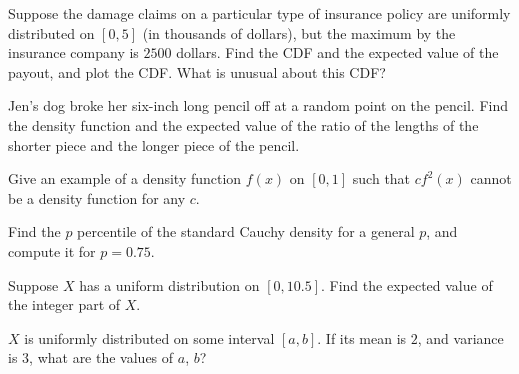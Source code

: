 \begin{problem}
  Suppose the damage claims on a particular type of insurance policy are
  uniformly distributed on \([0,5]\) (in thousands of dollars), but the
  maximum by the insurance company is \(2500\) dollars. Find the CDF and
  the expected value of the payout, and plot the CDF. What is unusual about
  this CDF?
\end{problem}
\begin{solution*}
\end{solution*}

\begin{problem}
  Jen's dog broke her six-inch long pencil off at a random point on the
  pencil. Find the density function and the expected value of the ratio of
  the lengths of the shorter piece and the longer piece of the pencil.
\end{problem}
\begin{solution*}
\end{solution*}

\begin{problem}
  Give an example of a density function \(f(x)\) on \([0,1]\) such that
  \(cf^2(x)\) cannot be a density function for any \(c\).
\end{problem}
\begin{solution*}
\end{solution*}

\begin{problem}
  Find the \(p\) percentile of the standard Cauchy density for
  a general \(p\), and compute it for \(p=0.75\).
\end{problem}
\begin{solution*}
\end{solution*}

\begin{problem}
  Suppose \(X\) has a uniform distribution on \([0,10.5]\). Find the
  expected value of the integer part of \(X\).
\end{problem}
\begin{solution*}
\end{solution*}

\begin{problem}[Handout 12, \# 23]
  \(X\) is uniformly distributed on some interval \([a,b]\). If its mean is
  \(2\), and variance is \(3\), what are the values of \(a\), \(b\)?
\end{problem}
\begin{solution*}
\end{solution*}

